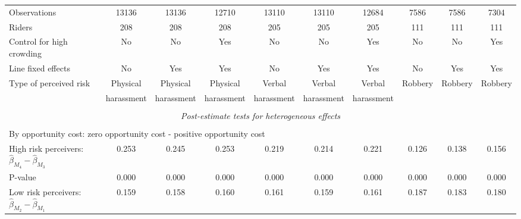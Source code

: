 \begin{tabular}{l*{9}{c}}
Observations        &       13136         &       13136         &       12710         &       13110         &       13110         &       12684         &        7586         &        7586         &        7304         \\
Riders              &         208         &         208         &         208         &         205         &         205         &         205         &         111         &         111         &         111         \\
Control for high crowding&          No         &          No         &         Yes         &          No         &          No         &         Yes         &          No         &          No         &         Yes         \\
Line fixed effects  &          No         &         Yes         &         Yes         &          No         &         Yes         &         Yes         &          No         &         Yes         &         Yes         \\
\multirow{2}{*}{Type of perceived risk}&    Physical         &    Physical         &    Physical         &      Verbal         &      Verbal         &      Verbal         &\multirow{2}{*}{Robbery}         &\multirow{2}{*}{Robbery}         &\multirow{2}{*}{Robbery}         \\
\,                  &  harassment         &  harassment         &  harassment         &  harassment         &  harassment         &  harassment         &                     &                     &                     \\
\hline \\[-1ex] \multicolumn{10}{c}{\textit{Post-estimate tests for heterogeneous effects}} \\\\[-1ex] \multicolumn{10}{l}{By opportunity cost: zero opportunity cost - positive opportunity cost} \\ \quad High risk perceivers: $\hat\beta_{M_4} - \hat\beta_{M_3}$&       0.253         &       0.245         &       0.253         &       0.219         &       0.214         &       0.221         &       0.126         &       0.138         &       0.156         \\
\quad P-value       &       0.000         &       0.000         &       0.000         &       0.000         &       0.000         &       0.000         &       0.000         &       0.000         &       0.000         \\
\quad Low risk perceivers: $\hat\beta_{M_2} - \hat\beta_{M_1}$&       0.159         &       0.158         &       0.160         &       0.161         &       0.159         &       0.161         &       0.187         &       0.183         &       0.180         \\

\end{tabular}
